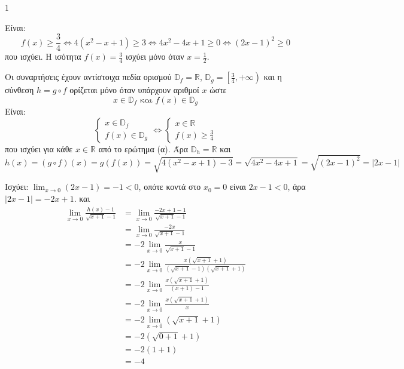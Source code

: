\begin{ylh}{1}
    \item [Ύλη από εικόνα]
\end{ylh}
\begin{alist}
\item Είναι:
\[
f(x) \ge \frac{3}{4} \Leftrightarrow 4(x^2 - x + 1) \ge 3 \Leftrightarrow 4x^2 - 4x + 1 \ge 0 \Leftrightarrow (2x-1)^2 \ge 0
\]
που ισχύει. Η ισότητα $f(x) = \frac{3}{4}$ ισχύει μόνο όταν $x = \frac{1}{2}$. 
\item Οι συναρτήσεις έχουν αντίστοιχα πεδία ορισμού $\mathbb{D}_f = \mathbb{R}$, $\mathbb{D}_g = \left[ \frac{3}{4}, +\infty \right)$ και η σύνθεση $h = g \circ f$ ορίζεται μόνο όταν υπάρχουν αριθμοί $x$ ώστε
\[
x \in \mathbb{D}_f \text{ και } f(x) \in \mathbb{D}_g
\]
Είναι:
\[
\begin{cases}
x \in \mathbb{D}_f \\
f(x) \in \mathbb{D}_g
\end{cases}
\Leftrightarrow
\begin{cases}
x \in \mathbb{R} \\
f(x) \ge \frac{3}{4}
\end{cases}
\]
που ισχύει για κάθε $x \in \mathbb{R}$ από το ερώτημα (α).
Άρα $\mathbb{D}_h = \mathbb{R}$ και
\[
h(x) = (g \circ f)(x) = g(f(x)) = \sqrt{4(x^2 - x + 1) - 3} = \sqrt{4x^2 - 4x + 1} = \sqrt{(2x-1)^2} = |2x-1|
\] 
\item Ισχύει: $\lim_{x \to 0}(2x-1) = -1 < 0$, οπότε κοντά στο $x_0=0$ είναι $2x-1 < 0$, άρα $|2x-1| = -2x+1$.
και
\begin{align*}
\lim_{x \to 0}\frac{h(x)-1}{\sqrt{x+1}-1} &= \lim_{x \to 0}\frac{-2x+1-1}{\sqrt{x+1}-1} \\
&= \lim_{x \to 0}\frac{-2x}{\sqrt{x+1}-1} \\
&= -2\lim_{x \to 0}\frac{x}{\sqrt{x+1}-1} \\
&= -2\lim_{x \to 0}\frac{x(\sqrt{x+1}+1)}{(\sqrt{x+1}-1)(\sqrt{x+1}+1)} \\
&= -2\lim_{x \to 0}\frac{x(\sqrt{x+1}+1)}{(x+1)-1} \\
&= -2\lim_{x \to 0}\frac{x(\sqrt{x+1}+1)}{x} \\
&= -2\lim_{x \to 0}(\sqrt{x+1}+1) \\
&= -2(\sqrt{0+1}+1) \\
&= -2(1+1) \\
&= -4
\end{align*} 
\end{alist}